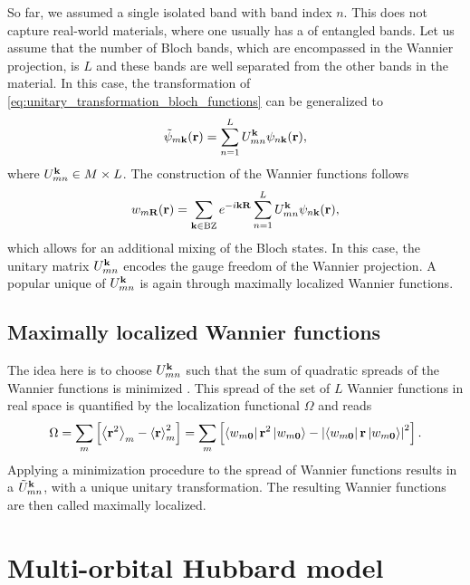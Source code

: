 \documentclass[../../main.tex]{subfiles}
\begin{document}
So far, we assumed a single isolated band with band index $n$. This does not capture real-world materials, where one usually has a  of entangled bands. Let us assume that the number of Bloch bands, which are encompassed in the Wannier projection, is $L$ and these bands are well separated from the other bands in the material. In this case, the transformation of \eqref{eq:unitary_transformation_bloch_functions} can be generalized to
\begin{align}
		\tilde{\psi}_{m\textbf{k}}(\textbf{r})=\sum_{n=1}^{L}U_{mn}^{\textbf{k}}\psi_{n\textbf{k}}(\textbf{r}),
\end{align}
where $U_{mn}^{\textbf{k}}\in M\times L$. The construction of the Wannier functions follows
\begin{align}
	w_{m\textbf{R}}(\textbf{r})=\sum_{\textbf{k}\in\text{BZ}}e^{-i\textbf{kR}}\sum_{n=1}^{L}U_{mn}^{\textbf{k}}\psi_{n\textbf{k}}(\textbf{r}),
\end{align}
which allows for an additional mixing of the Bloch states. In this case, the unitary matrix $U_{mn}^{\textbf{k}}$ encodes the gauge freedom of the Wannier projection. A popular unique  of $U_{mn}^{\textbf{k}}$ is again through maximally localized Wannier functions.

\subsection{Maximally localized Wannier functions}\label{sec:maximally_localized_wannier_functions}

The idea here is to choose $U_{mn}^{\textbf{k}}$ such that the sum of quadratic spreads of the Wannier functions is minimized \cite{Marzari1997}. This spread of the set of $L$ Wannier functions in real space is quantified by the localization functional $\Omega$ and reads
\begin{align}
	\Omega=\sum_m \left [\left\langle \textbf{r}^2\right\rangle_m-\left\langle \textbf{r}\right\rangle^2_m\right ]=\sum_m \left [\bra{w_{m\textbf{0}}} \textbf{r}^2 \ket{w_{m\textbf{0}}}-\left |\bra{w_{m\textbf{0}}} \textbf{r} \ket{w_{m\textbf{0}}}\right |^2\right ].
\end{align}
Applying a minimization procedure to the spread of Wannier functions results in a  $\tilde U_{mn}^{\textbf{k}}$, with a unique unitary transformation. The resulting Wannier functions are then called maximally localized. 

\section{Multi-orbital Hubbard model}\label{sec:multi_orbital_hubbard}
\end{document}
